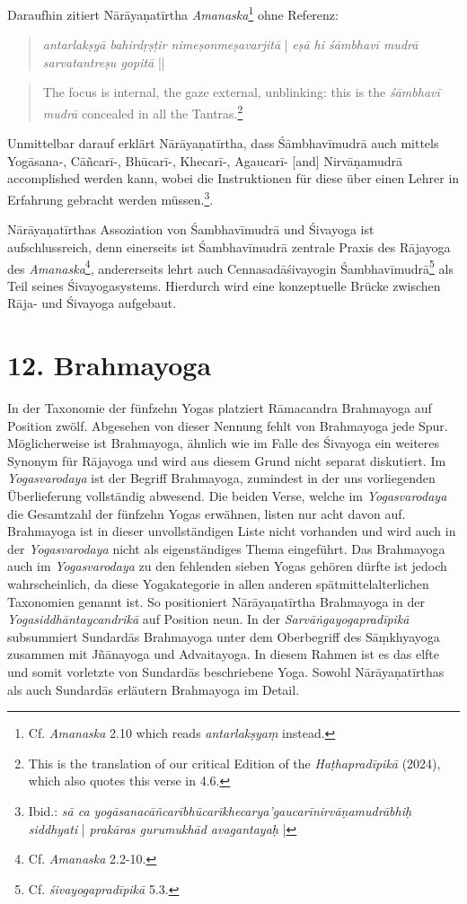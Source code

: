 Daraufhin zitiert Nārāyaṇatīrtha \textit{Amanaska}\footnote{Cf. \textit{Amanaska} 2.10 which reads \textit{antarlakṣyaṃ} instead.} ohne Referenz:
\begin{quote}
\textit{antarlakṣyā bahirdṛṣṭir nimeṣonmeṣavarjitā} |
\textit{eṣā hi śāmbhavī mudrā sarvatantreṣu gopitā} ||
\end{quote}
\begin{quote}
 The focus is internal, the gaze external, unblinking: this is the \emph{śāmbhavī mudrā} concealed in all the Tantras.\footnote{This is the translation of our critical Edition of the \textit{Haṭhapradīpikā} (2024), which also quotes this verse in 4.6.} 
  \end{quote}

Unmittelbar darauf erklärt Nārāyaṇatīrtha, dass Śāmbhavīmudrā auch mittels Yogāsana-, Cāñcarī-, Bhūcarī-, Khecarī-, Agaucarī- [and] Nirvāṇamudrā accomplished werden kann, wobei die Instruktionen für diese über einen Lehrer in Erfahrung gebracht werden müssen.\footnote{Ibid.: \textit{sā ca yogāsanacāñcarībhūcarīkhecarya'gaucarīnirvāṇamudrābhiḥ siddhyati} | \textit{prakāras gurumukhād avagantayaḥ} |}.    

Nārāyaṇatīrthas Assoziation von Śambhavīmudrā und Śivayoga ist aufschlussreich, denn einerseits ist Śambhavīmudrā zentrale Praxis des Rājayoga des \textit{Amanaska}\footnote{Cf. \textit{Amanaska} 2.2-10.}, andererseits lehrt auch Cennasadāśivayogin Śambhavīmudrā\footnote{Cf. \textit{śivayogapradīpikā} 5.3.} als Teil seines Śivayogasystems. Hierdurch wird eine konzeptuelle Brücke zwischen Rāja- und Śivayoga aufgebaut.  

\section{12. Brahmayoga}
\label{brahmayogaintro}

In der Taxonomie der fünfzehn Yogas platziert Rāmacandra Brahmayoga auf Position zwölf. Abgesehen von dieser Nennung fehlt von Brahmayoga jede Spur. Möglicherweise ist Brahmayoga, ähnlich wie im Falle des Śivayoga ein weiteres Synonym für Rājayoga und wird aus diesem Grund nicht separat diskutiert. Im \textit{Yogasvarodaya} ist der Begriff Brahmayoga, zumindest in der uns vorliegenden Überlieferung vollständig abwesend. Die beiden Verse, welche im \textit{Yogasvarodaya} die Gesamtzahl der fünfzehn Yogas erwähnen, listen nur acht davon auf. Brahmayoga ist in dieser unvollständigen Liste nicht vorhanden und wird auch in der \textit{Yogasvarodaya} nicht als eigenständiges Thema eingeführt. Das Brahmayoga auch im \textit{Yogasvarodaya} zu den fehlenden sieben Yogas gehören dürfte ist jedoch wahrscheinlich, da diese Yogakategorie in allen anderen spätmittelalterlichen Taxonomien genannt ist. So positioniert Nārāyaṇatīrtha Brahmayoga in der \textit{Yogasiddhāntaycandrikā} auf Position neun. In der \textit{Sarvāṅgayogapradīpikā} subsummiert Sundardās Brahmayoga unter dem Oberbegriff des Sāṃkhyayoga zusammen mit Jñānayoga und Advaitayoga. In diesem Rahmen ist es das elfte und somit vorletzte von Sundardās beschriebene Yoga. Sowohl Nārāyaṇatīrthas als auch Sundardās erläutern Brahmayoga im Detail. 

